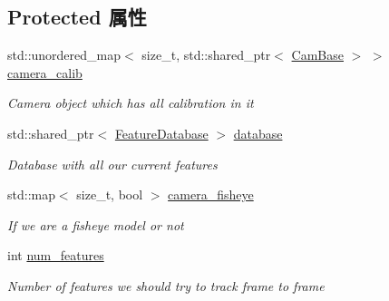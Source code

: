 \subsection*{Protected 属性}
\begin{DoxyCompactItemize}
\item 
\mbox{\label{classov__core_1_1TrackBase_a052a06d61aadf4a12a8739f0221d3e6b}} 
std\+::unordered\+\_\+map$<$ size\+\_\+t, std\+::shared\+\_\+ptr$<$ \hyperlink{classov__core_1_1CamBase}{Cam\+Base} $>$ $>$ \hyperlink{classov__core_1_1TrackBase_a052a06d61aadf4a12a8739f0221d3e6b}{camera\+\_\+calib}
\begin{DoxyCompactList}\small\item\em Camera object which has all calibration in it \end{DoxyCompactList}\item 
\mbox{\label{classov__core_1_1TrackBase_a832d13076b7d5ef3d6481deb5ce3000d}} 
std\+::shared\+\_\+ptr$<$ \hyperlink{classov__core_1_1FeatureDatabase}{Feature\+Database} $>$ \hyperlink{classov__core_1_1TrackBase_a832d13076b7d5ef3d6481deb5ce3000d}{database}
\begin{DoxyCompactList}\small\item\em Database with all our current features \end{DoxyCompactList}\item 
\mbox{\label{classov__core_1_1TrackBase_a10325315c2e52ab8367097d57b7020c6}} 
std\+::map$<$ size\+\_\+t, bool $>$ \hyperlink{classov__core_1_1TrackBase_a10325315c2e52ab8367097d57b7020c6}{camera\+\_\+fisheye}
\begin{DoxyCompactList}\small\item\em If we are a fisheye model or not \end{DoxyCompactList}\item 
\mbox{\label{classov__core_1_1TrackBase_a22e5b8a82308be5190933e5991891e9a}} 
int \hyperlink{classov__core_1_1TrackBase_a22e5b8a82308be5190933e5991891e9a}{num\+\_\+features}
\begin{DoxyCompactList}\small\item\em Number of features we should try to track frame to frame \end{DoxyCompactList}\item 

\end{DoxyCompactItemize}
